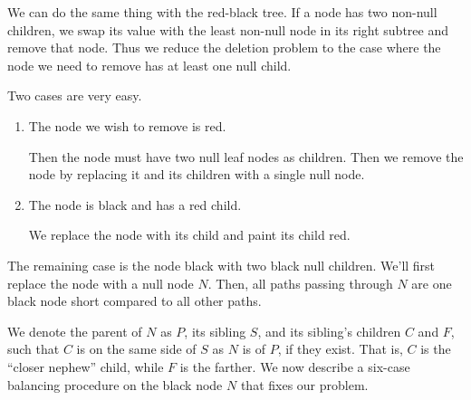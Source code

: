 \documentclass[11pt]{book}
\begin{document}
We can do the same thing with the red-black tree. If a node has two non-null children, we swap its value with the least non-null node in its right subtree and remove that node. Thus we reduce the deletion problem to the case where the node we need to remove has at least one null child.

Two cases are very easy.

\begin{enumerate}

\item
The node we wish to remove is red.

Then the node must have two null leaf nodes as children. Then we remove the node by replacing it and its children with a single null node.

\item
The node is black and has a red child.

We replace the node with its child and paint its child red.

\end{enumerate}

The remaining case is the node black with two black null children. We'll first replace the node with a null node $N$. Then, all paths passing through $N$ are one black node short compared to all other paths.

We denote the parent of $N$ as $P$, its sibling $S$, and its sibling's children $C$ and $F$, such that $C$ is on the same side of $S$ as $N$ is of $P$, if they exist. That is, $C$ is the ``closer nephew'' child, while $F$ is the farther. We now describe a six-case balancing procedure on the black node $N$ that fixes our problem.
\end{document}
